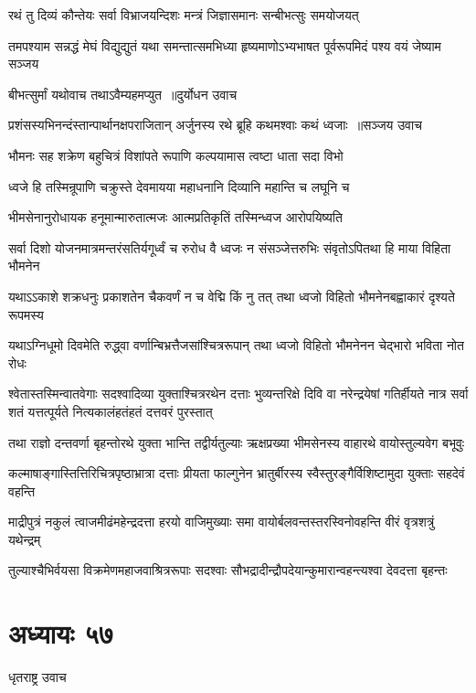 \twolineshloka
{रथं तु दिव्यं कौन्तेयः सर्वा विभ्राजयन्दिशः}
{मन्त्रं जिज्ञासमानः सन्बीभत्सुः समयोजयत्}


\threelineshloka
{तमपश्याम सन्नद्धं मेघं विद्युद्युतं यथा}
{समन्तात्समभिध्या हृष्यमाणोऽभ्यभाषत}
{पूर्वरूपमिदं पश्य वयं जेष्याम सञ्जय}


\twolineshloka
{बीभत्सुर्मां यथोवाच तथाऽवैम्यहमप्युत ॥दुर्योधन उवाच}
{}


\threelineshloka
{प्रशंसस्यभिनन्दंस्तान्पार्थानक्षपराजितान्}
{अर्जुनस्य रथे ब्रूहि कथमश्वाः कथं ध्वजाः ॥सञ्जय उवाच}
{}


\twolineshloka
{भौमनः सह शक्रेण बहुचित्रं विशांपते}
{रूपाणि कल्पयामास त्वष्टा धाता सदा विभो}


\twolineshloka
{ध्वजे हि तस्मिन्रूपाणि चक्रुस्ते देवमायया}
{महाधनानि दिव्यानि महान्ति च लघूनि च}


\twolineshloka
{भीमसेनानुरोधायक हनूमान्मारुतात्मजः}
{आत्मप्रतिकृतिं तस्मिन्ध्वज आरोपयिष्यति}


\twolineshloka
{सर्वा दिशो योजनमात्रमन्तरंसतिर्यगूर्ध्वं च रुरोध वै ध्वजः}
{न संसञ्जेत्तरुभिः संवृतोऽपितथा हि माया विहिता भौमनेन}


\twolineshloka
{यथाऽऽकाशे शक्रधनुः प्रकाशतेन चैकवर्णं न च वेद्मि किं नु तत्}
{तथा ध्वजो विहितो भौमनेनबह्वाकारं दृश्यते रूपमस्य}


\threelineshloka
{यथाऽग्निधूमो दिवमेति रुद्ध्वा}
{वर्णान्बिभ्रत्तैजसांश्चित्ररूपान्}
{तथा ध्वजो विहितो भौमनेनन चेद्भारो भविता नोत रोधः}


\threelineshloka
{श्वेतास्तस्मिन्वातवेगाः सदश्वादिव्या युक्ताश्चित्ररथेन दत्ताः}
{भुव्यन्तरिक्षे दिवि वा नरेन्द्रयेषां गतिर्हीयते नात्र सर्वा}
{शतं यत्तत्पूर्यते नित्यकालंहतंहतं दत्तवरं पुरस्तात्}


\twolineshloka
{तथा राज्ञो दन्तवर्णा बृहन्तोरथे युक्ता भान्ति तद्वीर्यतुल्याः}
{ऋक्षप्रख्या भीमसेनस्य वाहारथे वायोस्तुल्यवेग बभूवुः}


\twolineshloka
{कल्माषाङ्गास्तित्तिरिचित्रपृष्ठाभ्रात्रा दत्ताः प्रीयता फाल्गुनेन}
{भ्रातुर्बीरस्य स्वैस्तुरङ्गैर्विशिष्टामुदा युक्ताः सहदेवं वहन्ति}


\threelineshloka
{माद्रीपुत्रं नकुलं त्वाजमीढंमहेन्द्रदत्ता हरयो वाजिमुख्याः}
{समा वायोर्बलवन्तस्तरस्विनोवहन्ति वीरं वृत्रशत्रुं यथेन्द्रम्}
{}


\twolineshloka
{तुल्याश्चैभिर्वयसा विक्रमेणमहाजवाश्रित्ररूपाः सदश्वाः}
{सौभद्रादीन्द्रौपदेयान्कुमारान्वहन्त्यश्वा देवदत्ता बृहन्तः}


\chapter{अध्यायः ५७}
\twolineshloka
{धृतराष्ट्र उवाच}
{}


